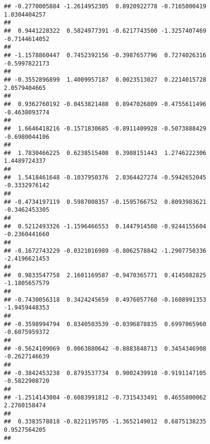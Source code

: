 \documentclass[]{article}
\begin{document}
\begin{verbatim}
## -0.2770005884 -1.2614952305  0.8920922778 -0.7165000419  1.0304404257 
##                                                                       
##  0.9441228322  0.5824977391 -0.6217743500 -1.3257407469 -0.7144614052 
##                                                                       
## -1.1578860447  0.7452392156 -0.3987657796  0.7274026316 -0.5997822173 
##                                                                       
## -0.3552896899  1.4009957187  0.0023513027  0.2214015728  2.0579404665 
##                                                                       
##  0.9362760192 -0.0453821488  0.8947026809 -0.4755611496 -0.4638093774 
##                                                                       
##  1.6646418216 -0.1571830685 -0.8911409928 -0.5073888429 -0.6980044106 
##                                                                       
##  1.7830466225  0.6238515408  0.3988151443  1.2746222306  1.4489724337 
##                                                                       
##  1.5418461648 -0.1037950376  2.0364427274 -0.5942652045 -0.3332976142 
##                                                                       
## -0.4734197119  0.5987008357 -0.1595766752  0.8093983621 -0.3462453305 
##                                                                       
##  0.5212493326 -1.1596466553  0.1447914508 -0.9244155604 -0.2360441660 
##                                                                       
## -0.1672743229 -0.0321016989 -0.8062578842 -1.2907750336 -2.4196621453 
##                                                                       
##  0.9833547758  2.1601169587 -0.9470365771  0.4145082825 -1.1805657579 
##                                                                       
## -0.7430056318  0.3424245659  0.4976057760 -0.1608991353 -1.9459448353 
##                                                                       
## -0.3598994794  0.8340503539 -0.0396878835  0.6997065960 -0.6075959372 
##                                                                       
## -0.5624109069  0.0063880642 -0.8883848713  0.3454346908 -0.2627146639 
##                                                                       
## -0.3842453238  0.8793537734  0.9002439910 -0.9191147105 -0.5822908720 
##                                                                       
## -1.2514143004 -0.6083991812 -0.7315433491  0.4655800062  2.2760158474 
##                                                                       
##  0.3383578818 -0.8221195705 -1.3652149012  0.6875138235  0.9527564205 
##                                                                       

\end{verbatim}
\end{document}
